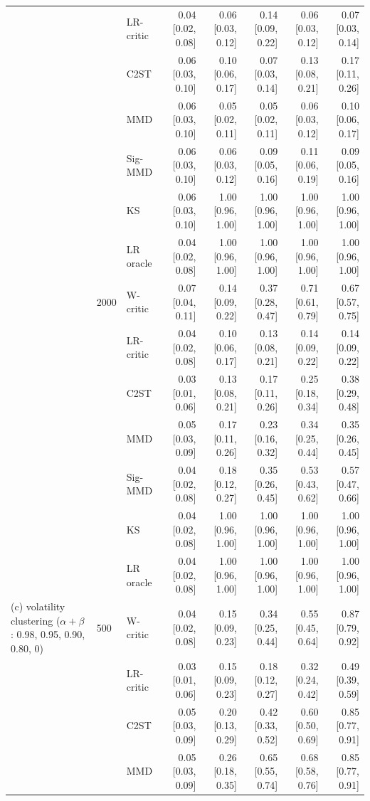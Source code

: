\begin{tabular}{lllrrrrr}
 &  & LR-critic & 0.04 [0.02, 0.08] & 0.06 [0.03, 0.12] & 0.14 [0.09, 0.22] & 0.06 [0.03, 0.12] & 0.07 [0.03, 0.14] \\
 &  & C2ST & 0.06 [0.03, 0.10] & 0.10 [0.06, 0.17] & 0.07 [0.03, 0.14] & 0.13 [0.08, 0.21] & 0.17 [0.11, 0.26] \\
 &  & MMD & 0.06 [0.03, 0.10] & 0.05 [0.02, 0.11] & 0.05 [0.02, 0.11] & 0.06 [0.03, 0.12] & 0.10 [0.06, 0.17] \\
 &  & Sig-MMD & 0.06 [0.03, 0.10] & 0.06 [0.03, 0.12] & 0.09 [0.05, 0.16] & 0.11 [0.06, 0.19] & 0.09 [0.05, 0.16] \\
 &  & KS & 0.06 [0.03, 0.10] & 1.00 [0.96, 1.00] & 1.00 [0.96, 1.00] & 1.00 [0.96, 1.00] & 1.00 [0.96, 1.00] \\
 &  & LR oracle & 0.04 [0.02, 0.08] & 1.00 [0.96, 1.00] & 1.00 [0.96, 1.00] & 1.00 [0.96, 1.00] & 1.00 [0.96, 1.00] \\
 & 2000 & W-critic & 0.07 [0.04, 0.11] & 0.14 [0.09, 0.22] & 0.37 [0.28, 0.47] & 0.71 [0.61, 0.79] & 0.67 [0.57, 0.75] \\
 &  & LR-critic & 0.04 [0.02, 0.08] & 0.10 [0.06, 0.17] & 0.13 [0.08, 0.21] & 0.14 [0.09, 0.22] & 0.14 [0.09, 0.22] \\
 &  & C2ST & 0.03 [0.01, 0.06] & 0.13 [0.08, 0.21] & 0.17 [0.11, 0.26] & 0.25 [0.18, 0.34] & 0.38 [0.29, 0.48] \\
 &  & MMD & 0.05 [0.03, 0.09] & 0.17 [0.11, 0.26] & 0.23 [0.16, 0.32] & 0.34 [0.25, 0.44] & 0.35 [0.26, 0.45] \\
 &  & Sig-MMD & 0.04 [0.02, 0.08] & 0.18 [0.12, 0.27] & 0.35 [0.26, 0.45] & 0.53 [0.43, 0.62] & 0.57 [0.47, 0.66] \\
 &  & KS & 0.04 [0.02, 0.08] & 1.00 [0.96, 1.00] & 1.00 [0.96, 1.00] & 1.00 [0.96, 1.00] & 1.00 [0.96, 1.00] \\
 &  & LR oracle & 0.04 [0.02, 0.08] & 1.00 [0.96, 1.00] & 1.00 [0.96, 1.00] & 1.00 [0.96, 1.00] & 1.00 [0.96, 1.00] \\
(c) volatility clustering ($\alpha+\beta$: 0.98, 0.95, 0.90, 0.80, 0) & 500 & W-critic & 0.04 [0.02, 0.08] & 0.15 [0.09, 0.23] & 0.34 [0.25, 0.44] & 0.55 [0.45, 0.64] & 0.87 [0.79, 0.92] \\
 &  & LR-critic & 0.03 [0.01, 0.06] & 0.15 [0.09, 0.23] & 0.18 [0.12, 0.27] & 0.32 [0.24, 0.42] & 0.49 [0.39, 0.59] \\
 &  & C2ST & 0.05 [0.03, 0.09] & 0.20 [0.13, 0.29] & 0.42 [0.33, 0.52] & 0.60 [0.50, 0.69] & 0.85 [0.77, 0.91] \\
 &  & MMD & 0.05 [0.03, 0.09] & 0.26 [0.18, 0.35] & 0.65 [0.55, 0.74] & 0.68 [0.58, 0.76] & 0.85 [0.77, 0.91] \\

\end{tabular}

